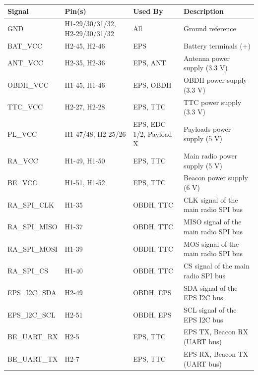 \begin{table}[!h]
    \centering
    \begin{tabular}{lL{0.18\textwidth}L{0.17\textwidth}L{0.33\textwidth}}
        \toprule[1.5pt]
        \textbf{Signal}  & \textbf{Pin(s)} & \textbf{Used By}     & \textbf{Description} \\
        \midrule
        GND              & H1-29/30/31/32, H2-29/30/31/32 & All   & Ground reference \\
        BAT\_VCC         & H2-45, H2-46    & EPS                  & Battery terminals (+) \\
        ANT\_VCC         & H2-35, H2-36    & EPS, ANT             & Antenna power supply (3.3 V) \\
        OBDH\_VCC        & H1-45, H1-46    & EPS, OBDH            & OBDH power supply (3.3 V) \\
        TTC\_VCC         & H2-27, H2-28    & EPS, TTC             & TTC power supply (3.3 V) \\
        PL\_VCC          & H1-47/48, H2-25/26 & EPS, EDC 1/2, Payload X & Payloads power supply (5 V) \\
        RA\_VCC          & H1-49, H1-50    & EPS, TTC             & Main radio power supply (5 V) \\
        BE\_VCC          & H1-51, H1-52    & EPS, TTC             & Beacon power supply (6 V) \\
        RA\_SPI\_CLK     & H1-35           & OBDH, TTC            & CLK signal of the main radio SPI bus \\
        RA\_SPI\_MISO    & H1-37           & OBDH, TTC            & MISO signal of the main radio SPI bus \\
        RA\_SPI\_MOSI    & H1-39           & OBDH, TTC            & MOS signal of the main radio SPI bus \\
        RA\_SPI\_CS      & H1-40           & OBDH, TTC            & CS signal of the main radio SPI bus \\
        EPS\_I2C\_SDA    & H2-49           & OBDH, EPS            & SDA signal of the EPS I2C bus \\
        EPS\_I2C\_SCL    & H2-51           & OBDH, EPS            & SCL signal of the EPS I2C bus \\
        BE\_UART\_RX     & H2-5            & EPS, TTC             & EPS TX, Beacon RX (UART bus) \\
        BE\_UART\_TX     & H2-7            & EPS, TTC             & EPS RX, Beacon TX (UART bus) \\

\end{tabular}
\end{table}
